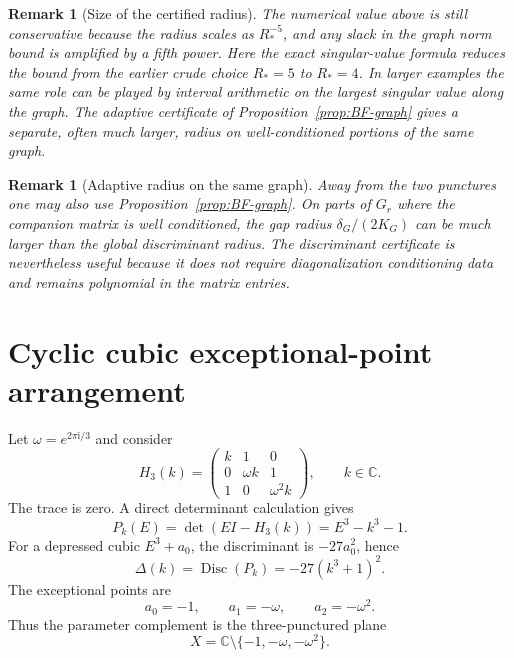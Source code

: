 \documentclass[11pt]{article}
\newtheorem{remark}[theorem]{Remark}
\numberwithin{equation}{section}
\DeclareMathOperator{\Disc}{Disc}
\newcommand{\bbC}{\mathbb C}
\newcommand{\ii}{\mathrm i}
\begin{document}
\begin{remark}[Size of the certified radius]
The numerical value above is still conservative because the radius scales
as \(R_*^{-5}\), and any slack in the graph norm bound is amplified by a
fifth power.  Here the exact singular-value formula reduces the bound from
the earlier crude choice \(R_*=5\) to \(R_*=4\).  In larger examples the same
role can be played by interval arithmetic on the largest singular value along
the graph.  The adaptive certificate of Proposition~\ref{prop:BF-graph}
gives a separate, often much larger, radius on well-conditioned portions of
the same graph.
\end{remark}

\begin{remark}[Adaptive radius on the same graph]
Away from the two punctures one may also use
Proposition~\ref{prop:BF-graph}.  On parts of \(G_r\) where the companion
matrix is well conditioned, the gap radius
\(\delta_G/(2K_G)\) can be much larger than the global discriminant radius.
The discriminant certificate is nevertheless useful because it does not
require diagonalization conditioning data and remains polynomial in the
matrix entries.
\end{remark}

\section{Cyclic cubic exceptional-point arrangement}\label{sec:EP3}

Let $\omega=e^{2\pi\ii/3}$ and consider
\[
H_3(k)=
\begin{pmatrix}
 k&1&0\\
 0&\omega k&1\\
 1&0&\omega^2 k
\end{pmatrix},\qquad k\in\bbC.
\]
The trace is zero.  A direct determinant calculation gives
\[
  P_k(E)=\det(EI-H_3(k))=E^3-k^3-1.
\]
For a depressed cubic $E^3+a_0$, the discriminant is $-27a_0^2$, hence
\[
  \Delta(k)=\Disc(P_k)=-27(k^3+1)^2.
\]
The exceptional points are
\[
  a_0=-1,
  \qquad a_1=-\omega,
  \qquad a_2=-\omega^2.
\]
Thus the parameter complement is the three-punctured plane
\[
  X=\bbC\setminus\{-1,-\omega,-\omega^2\}.
\]
\end{document}
